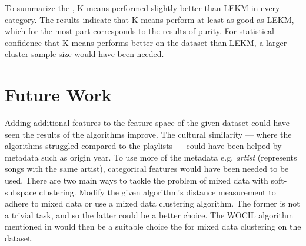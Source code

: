 \documentclass[../report.tex]{subfiles}
\begin{document}

To summarize the , K-means performed slightly better than LEKM in every category. The results indicate that K-means perform at least as good as LEKM, which for the most part corresponds to the results of purity. For statistical confidence that K-means performs better on the dataset than LEKM, a larger cluster sample size would have been needed.

\section{Future Work}
Adding additional features to the feature-space of the given dataset could have seen the results of the algorithms improve. The cultural similarity --- where the algorithms struggled compared to the playlists --- could have been helped by metadata such as origin year. To use more of the metadata e.g. \textit{artist} (represents songs with the same artist), categorical features would have been needed to be used. There are two main ways to tackle the problem of mixed data with soft-subspace clustering. Modify the given algorithm's distance measurement to adhere to mixed data or use a mixed data clustering algorithm. The former is not a trivial task, and so the latter could be a better choice. The WOCIL algorithm mentioned in \cite{Jia2018} would then be a suitable choice the for mixed data clustering on the dataset.
\end{document}
